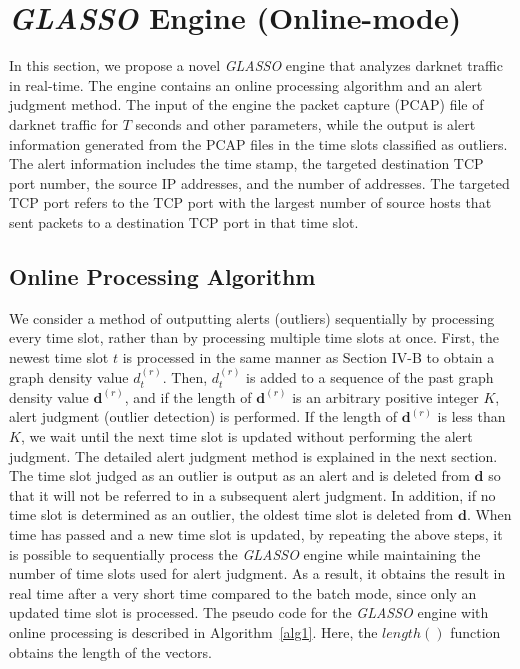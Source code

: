 \documentclass[conference]{IEEEtran}
\begin{document}
\section{{\it GLASSO} Engine (Online-mode)}
In this section, we propose a novel {\it GLASSO} engine that analyzes darknet traffic in real-time.
The engine contains an online processing algorithm and an alert judgment method.
The input of the engine  the packet capture (PCAP) file of darknet traffic for $T$ seconds and other parameters, while the output is alert information generated from the PCAP files in the time slots classified as outliers.
The alert information includes the time stamp, the targeted destination TCP port number, the source IP addresses, and the number of addresses.
The targeted TCP port refers to the TCP port with the largest number of source hosts that sent packets to a destination TCP port in that time slot.






\subsection{Online Processing Algorithm}
We consider a method of outputting alerts (outliers) sequentially by processing every time slot, rather than by processing multiple time slots at once.
First, the newest time slot $t$ is processed in the same manner as Section I\hspace{-.1em}V-B to obtain a graph density value $d_t^{(r)}$.
Then, $d_t^{(r)}$ is added to a sequence of the past graph density value $\bm{d}^{(r)}$, and if the length of $\bm{d}^{(r)}$ is an arbitrary positive integer $K$, alert judgment (outlier detection) is performed.
If the length of $\bm{d}^{(r)}$ is less than $K$, we wait until the next time slot is updated without performing the alert judgment.
The detailed alert judgment method is explained in the next section.
The time slot judged as an outlier is output as an alert and is deleted from $\bm{d}$ so that it will not be referred to in a subsequent alert judgment.
In addition, if no time slot is determined as an outlier, the oldest time slot is deleted from $\bm{d}$.
When time has passed and a new time slot is updated, by repeating the above steps, it is possible to sequentially process the {\it GLASSO} engine while maintaining the number of time slots used for alert judgment.
As a result, it obtains the result in real time after a very short time compared to the batch mode, since only an updated time slot is processed.
The pseudo code for the {\it GLASSO} engine with online processing is described in Algorithm~\ref{alg1}.
Here, the $length()$ function obtains the length of the vectors.
\end{document}
